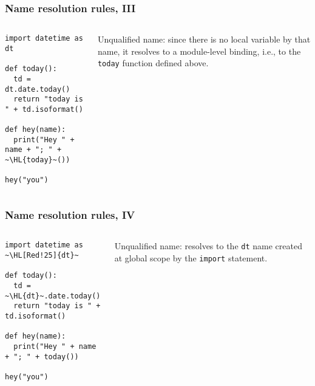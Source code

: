 \documentclass[english,serif,mathserif,xcolor=pdftex,dvipsnames,table]{beamer}
\begin{document}
\begin{frame}[fragile]
  \frametitle{Name resolution rules, III}
  \begin{columns}
    \begin{column}[t]{0.6\linewidth}
\begin{lstlisting}
import datetime as dt

def today():
  td = dt.date.today()
  return "today is " + td.isoformat()

def hey(name):
  print("Hey " + name + "; " + ~\HL{today}~())

hey("you")
\end{lstlisting}
    \end{column}
    \begin{column}[t]{0.4\linewidth}
      \raggedleft
      Unqualified name: since there is no local variable by that name,
      it resolves to a module-level binding, i.e., to the
      \texttt{today} function defined above.
    \end{column}
  \end{columns}
\end{frame}


\begin{frame}[fragile]
  \frametitle{Name resolution rules, IV}
  \begin{columns}
    \begin{column}[t]{0.6\linewidth}
\begin{lstlisting}
import datetime as ~\HL[Red!25]{dt}~

def today():
  td = ~\HL{dt}~.date.today()
  return "today is " + td.isoformat()

def hey(name):
  print("Hey " + name + "; " + today())

hey("you")
\end{lstlisting}
    \end{column}
    \begin{column}[t]{0.4\linewidth}
      \raggedleft
      Unqualified name: resolves to the \texttt{dt} name created at global scope by the \texttt{import} statement.
    \end{column}
  \end{columns}
\end{frame}
\end{document}
